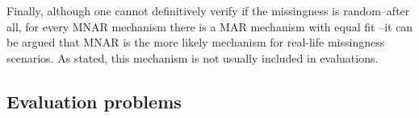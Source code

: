 \documentclass[bimj,fleqn]{w-art}
\begin{document}


Finally, although one cannot definitively verify if the missingness is random--after all, for every MNAR mechanism there is a MAR mechanism with equal fit \citep{molenberghs2008every}--it can be argued that MNAR is the more likely mechanism for real-life missingness scenarios. As stated, this mechanism is not usually included in evaluations.  %



\subsection{Evaluation problems}
\end{document}
